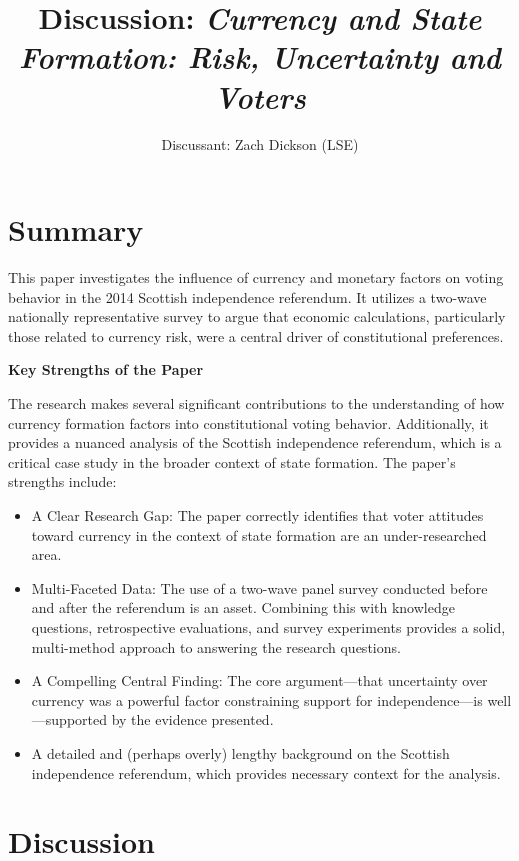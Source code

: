 \documentclass[
  letterpaper,
  DIV=11,
  numbers=noendperiod]{scrartcl}
\title{Discussion: \emph{Currency and State Formation: Risk, Uncertainty
and Voters}}
\author{Discussant: Zach Dickson (LSE)}
\date{}
\providecommand{\tightlist}{%
  \setlength{\itemsep}{0pt}\setlength{\parskip}{0pt}}\usepackage{longtable,booktabs,array}
\begin{document}
\maketitle

\section{Summary}\label{summary}

This paper investigates the influence of currency and monetary factors
on voting behavior in the 2014 Scottish independence referendum. It
utilizes a two-wave nationally representative survey to argue that
economic calculations, particularly those related to currency risk, were
a central driver of constitutional preferences.

\textbf{Key Strengths of the Paper}

The research makes several significant contributions to the
understanding of how currency formation factors into constitutional
voting behavior. Additionally, it provides a nuanced analysis of the
Scottish independence referendum, which is a critical case study in the
broader context of state formation. The paper's strengths include:

\begin{itemize}
\tightlist
\item
  A Clear Research Gap: The paper correctly identifies that voter
  attitudes toward currency in the context of state formation are an
  under-researched area.
\item
  Multi-Faceted Data: The use of a two-wave panel survey conducted
  before and after the referendum is an asset. Combining this with
  knowledge questions, retrospective evaluations, and survey experiments
  provides a solid, multi-method approach to answering the research
  questions.
\item
  A Compelling Central Finding: The core argument---that uncertainty
  over currency was a powerful factor constraining support for
  independence---is well---supported by the evidence presented.
\item
  A detailed and (perhaps overly) lengthy background on the Scottish
  independence referendum, which provides necessary context for the
  analysis.
\end{itemize}

\section{Discussion}\label{discussion}
\end{document}
